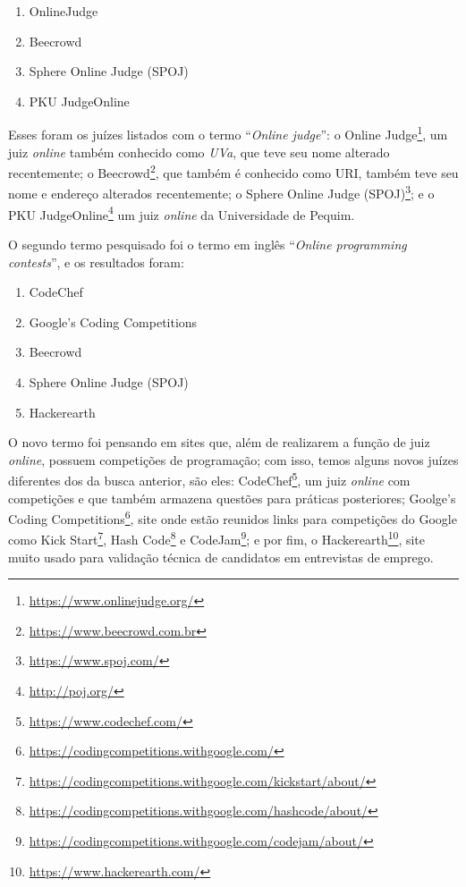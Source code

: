 \begin{enumerate}
    \item OnlineJudge
    \item Beecrowd
    \item Sphere Online Judge (SPOJ)
    \item PKU JudgeOnline
\end{enumerate}

Esses foram os juízes listados com o termo ``\textit{Online judge}'': o Online Judge\footnote{\url{https://www.onlinejudge.org/}}, um juiz \textit{online} também conhecido como \textit{UVa}, que teve seu nome alterado recentemente;
o Beecrowd\footnote{\url{https://www.beecrowd.com.br}}, que também é conhecido como URI,  também teve seu nome e endereço alterados recentemente; 
o Sphere Online Judge (SPOJ)\footnote{\url{https://www.spoj.com/}}; e o PKU JudgeOnline\footnote{\url{http://poj.org/}} um juiz \textit{online} da Universidade de Pequim.

O segundo termo pesquisado foi o termo em inglês ``\textit{Online programming contests}'', e os resultados foram:

\begin{enumerate}
    \item CodeChef
    \item Google's Coding Competitions
    \item Beecrowd
    \item Sphere Online Judge (SPOJ)
    \item Hackerearth
\end{enumerate}

O novo termo foi pensando em sites que, além de realizarem a função de juiz \textit{online}, possuem competições de programação; com isso, temos alguns novos juízes diferentes dos da busca anterior, são eles: CodeChef\footnote{\url{https://www.codechef.com/}}, um juiz \textit{online} com competições e que também armazena questões para práticas posteriores; Goolge's Coding Competitions\footnote{\url{https://codingcompetitions.withgoogle.com/}}, site onde estão reunidos links para competições do Google como Kick Start\footnote{\url{https://codingcompetitions.withgoogle.com/kickstart/about/}}, Hash Code\footnote{\url{https://codingcompetitions.withgoogle.com/hashcode/about/}} e CodeJam\footnote{\url{https://codingcompetitions.withgoogle.com/codejam/about/}}; e por fim, o Hackerearth\footnote{\url{https://www.hackerearth.com/}}, site muito usado para validação técnica de candidatos em entrevistas de emprego.

